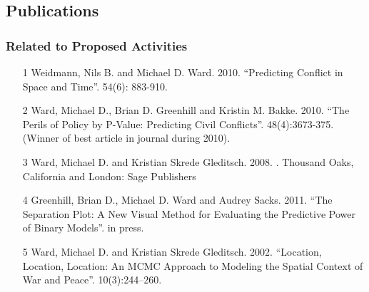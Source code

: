 \documentclass[pdftex,12pt,fullpage,oneside]{amsart}
\begin{document}
\subsection*{Publications}
\subsubsection*{Related to Proposed Activities}
\begin{itemize}

\item[1] Weidmann, Nils B. and Michael D. Ward. 2010. ``Predicting Conflict in Space and Time''.  54(6): 883-910.

\item[2] Ward, Michael D., Brian D. Greenhill and Kristin M. Bakke. 2010. ``The Perils of Policy by P-Value: Predicting Civil Conflicts''.  48(4):3673-375. (Winner of best article in journal during 2010).

\item[3] Ward, Michael D. and Kristian Skrede Gleditsch. 2008. . Thousand Oaks, California and London: Sage Publishers

\item[4] Greenhill, Brian D., Michael D. Ward and Audrey Sacks. 2011. ``The Separation Plot: A New Visual Method for Evaluating the Predictive Power of Binary Models''.  in press.

\item[5]
Ward, Michael D. and Kristian Skrede Gleditsch. 2002. ``Location, Location, Location: An MCMC Approach to Modeling the
  Spatial Context of War and Peace''.  10(3):244--260.
\end{itemize}
\end{document}

